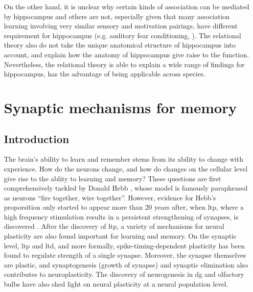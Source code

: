 On the other hand, it is unclear why certain kinds of association can be mediated by hippocampus and others are not, especially given that many association learning involving very similar sensory and motivation pairings, have different requirement for hippocampus (e.g. auditory fear conditioning, \citep{phillips92}). The relational theory also do not take the unique anatomical structure of hippocampus into account, and explain how the anatomy of hippocampus give raise to the function. Nevertheless, the relational theory is able to explain a wide range of findings for hippocampus, has the advantage of being applicable across species.

\begin{comment}
\subsubsection{Conclusion}
\citep{opitz14} hpc and memory
\citep{shohamy13} hpc in cognition
\citep{huijgen15} hpc node of memory

\citep{lee16} lesion studies review
\citep{mcdonald13} memory to behaviour
\citep{middei14} hpc in learning disorder
\citep{eichenbaum14} hpc where vs episodic
\citep{sasaki15} hpc memory circuit
\end{comment}

\section{Synaptic mechanisms for memory}
\subsection{Introduction}
The brain's ability to learn and remember stems from its ability to change with experience. How do the neurons change, and how do changes on the cellular level give rise to the ablity to learning and memory? These questions are first comprehensively tackled by Donald Hebb \citeyear{hebb49}, whose model is famously paraphrased as neurons ``fire together, wire together''. However, evidence for Hebb's proporsition only started to appear more than 20 years after, when \gls{ltp}, where a high frequency stimulation results in a persistent strengthening of synapses, is discovered \citep{bliss73}. After the discovery of \gls{ltp}, a variety of mechanisms for neural plasticity are also found important for learning and memory. On the synaptic level, \gls{ltp} and \gls{ltd}, and more formally, spike-timing-dependent plasticity has been found to regulate strength of a single synapse. Moreover, the synapse themselves are plastic, and synaptogenesis (growth of synapse) and synaptic elimination also contributes to neuroplasticity. The discovery of neurogenesis in \gls{dg} and olfactory bulbs have also shed light on neural plasticity at a neural population level.

